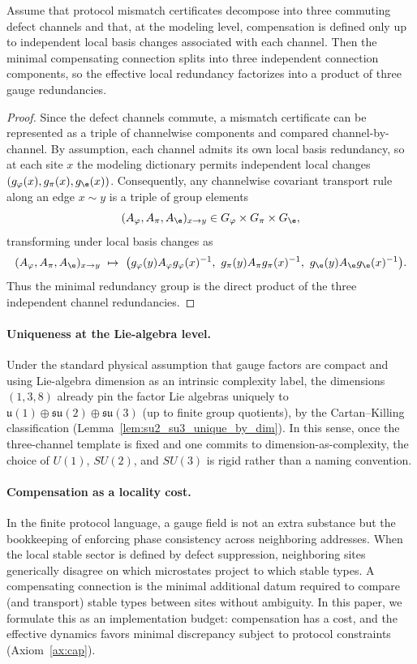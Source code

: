 \begin{proposition}\label{prop:three_factor_compensation}
Assume that protocol mismatch certificates decompose into three commuting defect channels and that, at the modeling level, compensation is defined only up to independent local basis changes associated with each channel.
Then the minimal compensating connection splits into three independent connection components, so the effective local redundancy factorizes into a product of three gauge redundancies.
\end{proposition}
\begin{proof}
Since the defect channels commute, a mismatch certificate can be represented as a triple of channelwise components and compared channel-by-channel.
By assumption, each channel admits its own local basis redundancy, so at each site $x$ the modeling dictionary permits independent local changes $(g_\varphi(x),g_\pi(x),g_\e(x))$.
Consequently, any channelwise covariant transport rule along an edge $x\sim y$ is a triple of group elements
\[
(A_\varphi,A_\pi,A_\e)_{x\to y}\in G_\varphi\times G_\pi\times G_\e,
\]
transforming under local basis changes as
\[
(A_\varphi,A_\pi,A_\e)_{x\to y}\ \mapsto\
\bigl(g_\varphi(y)A_\varphi g_\varphi(x)^{-1},\ g_\pi(y)A_\pi g_\pi(x)^{-1},\ g_\e(y)A_\e g_\e(x)^{-1}\bigr).
\]
Thus the minimal redundancy group is the direct product of the three independent channel redundancies.
\end{proof}

\paragraph{Uniqueness at the Lie-algebra level.}
Under the standard physical assumption that gauge factors are compact and using Lie-algebra dimension as an intrinsic complexity label, the dimensions $(1,3,8)$ already pin the factor Lie algebras uniquely to $\mathfrak{u}(1)\oplus\mathfrak{su}(2)\oplus\mathfrak{su}(3)$ (up to finite group quotients), by the Cartan--Killing classification (Lemma~\ref{lem:su2_su3_unique_by_dim}).
In this sense, once the three-channel template is fixed and one commits to dimension-as-complexity, the choice of $U(1)$, $SU(2)$, and $SU(3)$ is rigid rather than a naming convention.

\paragraph{Compensation as a locality cost.}
In the finite protocol language, a gauge field is not an extra substance but the bookkeeping of enforcing phase consistency across neighboring addresses.
When the local stable sector is defined by defect suppression, neighboring sites generically disagree on which microstates project to which stable types.
A compensating connection is the minimal additional datum required to compare (and transport) stable types between sites without ambiguity.
In this paper, we formulate this as an implementation budget: compensation has a cost, and the effective dynamics favors minimal discrepancy subject to protocol constraints (Axiom~\ref{ax:cap}).

